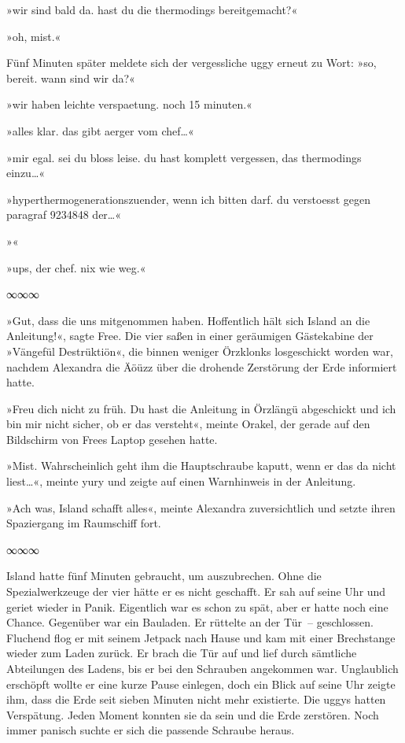 »wir sind bald da. hast du die thermodings bereitgemacht?«

»oh, mist.«

Fünf Minuten später meldete sich der vergessliche uggy erneut zu Wort: »so, bereit. wann sind wir da?«

»wir haben leichte verspaetung. noch 15 minuten.«

»alles klar. das gibt aerger vom chef…«

»mir egal. sei du bloss leise. du hast komplett vergessen, das thermodings einzu…«

»hyperthermogenerationszuender, wenn ich bitten darf. du verstoesst gegen paragraf 9234848 der…«

»«

»ups, der chef. nix wie weg.«

\begin{center}
    ∞∞∞
\end{center}

»Gut, dass die uns mitgenommen haben. Hoffentlich hält sich Island an die Anleitung!«, sagte Free. Die vier saßen in einer geräumigen Gästekabine der »Vängefül Destrüktiön«, die binnen weniger Örzklonks losgeschickt worden war, nachdem Alexandra die Äöüzz über die drohende Zerstörung der Erde informiert hatte.

»Freu dich nicht zu früh. Du hast die Anleitung in Örzlängü abgeschickt und ich bin mir nicht sicher, ob er das versteht«, meinte Orakel, der gerade auf den Bildschirm von Frees Laptop gesehen hatte.

»Mist. Wahrscheinlich geht ihm die Hauptschraube kaputt, wenn er das da nicht liest…«, meinte yury und zeigte auf einen Warnhinweis in der Anleitung.

»Ach was, Island schafft alles«, meinte Alexandra zuversichtlich und setzte ihren Spaziergang im Raumschiff fort.

\begin{center}
    ∞∞∞
\end{center}

Island hatte fünf Minuten gebraucht, um auszubrechen. Ohne die Spezialwerkzeuge der vier hätte er es nicht geschafft. Er sah auf seine Uhr und geriet wieder in Panik. Eigentlich war es schon zu spät, aber er hatte noch eine Chance. Gegenüber war ein Bauladen. Er rüttelte an der Tür~– geschlossen. Fluchend flog er mit seinem Jetpack nach Hause und kam mit einer Brechstange wieder zum Laden zurück. Er brach die Tür auf und lief durch sämtliche Abteilungen des Ladens, bis er bei den Schrauben angekommen war. Unglaublich erschöpft wollte er eine kurze Pause einlegen, doch ein Blick auf seine Uhr zeigte ihm, dass die Erde seit sieben Minuten nicht mehr existierte. Die uggys hatten Verspätung. Jeden Moment konnten sie da sein und die Erde zerstören. Noch immer panisch suchte er sich die passende Schraube heraus.

